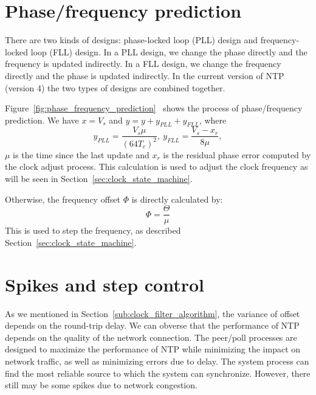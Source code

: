 

\section{Phase/frequency prediction}%
\label{sec:phase_frequency_prediction}
There are two kinds of designs: phase-locked loop (PLL) design and
frequency-locked loop (FLL) design. In a PLL design, we change the phase
directly and the frequency is updated indirectly. In a FLL design, we change
the frequency directly and the phase is updated indirectly. In the current
version of NTP (version 4) the two types of designs are combined together. 

Figure~\ref{fig:phase_frequency_prediction}~\cite{redbook} shows the process of
phase/frequency prediction. We have $x = V_s$ and $y = y + y_{PLL} + y_{FLL}$,
where
\begin{equation}
    y_{PLL} = \frac{V_s\mu}{\left(64T_c\right)^2},\
    y_{FLL} = \frac{V_s-x_r}{8\mu},
    \label{eq:y_pll}
\end{equation}
$\mu$ is the time since the last update and $x_r$ is the residual phase
error computed by the clock adjust process. This calculation is used to adjust
the clock frequency as will be seen in Section~\ref{sec:clock_state_machine}.

Otherwise, the frequency offset $\Phi$ is directly calculated by:
\begin{equation}
    \Phi = \frac{\Theta}{\mu}
    \label{eq:frequency_offset}
\end{equation}
This is used to step the frequency, as described
Section~\ref{sec:clock_state_machine}. 




\section{Spikes and step control}%
\label{sec:spikes_and_step_control}
As we mentioned in Section~\ref{sub:clock_filter_algorithm}, the variance of
offset depends on the round-trip delay. We can obverse that the performance of
NTP depends on the quality of the network connection. The peer/poll processes
are designed to maximize the performance of NTP while minimizing the impact on
network traffic, as well as minimizing errors due to delay. The system process
can find the most reliable source to which the system can synchronize. However,
there still may be some spikes due to network congestion. 

